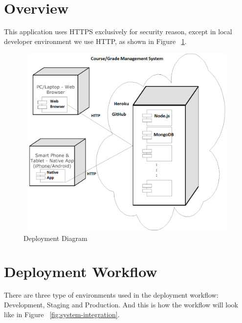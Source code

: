 
\section{Overview}
This application uses HTTPS exclusively for security reason, except in local developer environment we use HTTP, as shown in Figure ~\ref{fig:deployment}.

\vspace{3em}
\begin{figure}[H]
\begin{center}
\includegraphics[height=3.8in,width=6.5in]{images/deployment.png}
\caption{Deployment Diagram}
\label{fig:deployment}
\end{center}
\end{figure}

\section{Deployment Workflow}
There are three type of environments used in the deployment workflow: Development, Staging and Production. And this is how the workflow will look like in Figure  ~\ref{fig:system-integration}.

